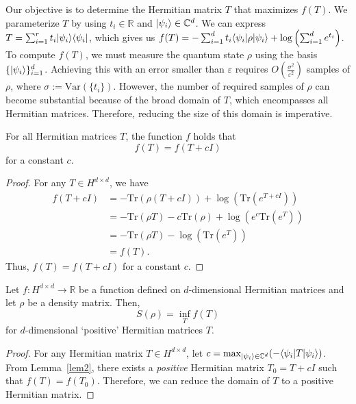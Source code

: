 \documentclass[aps,groupedaddress,superscriptaddress,amssymb,amsmath,amsbsy,amsfonts,twocolumn,pra]{revtex4}
\begin{document}
Our objective is to determine the Hermitian matrix $T$ that maximizes $f(T)$. We parameterize $T$ by using $t_i \in \mathbb{R}$ and $|\psi_i\rangle \in \mathbb{C}^d$. We can express $T = \sum_{i=1}^r t_i |\psi_i\rangle\langle\psi_i|$, which gives us $f(T) = -\sum_{i=1}^d t_i \langle\psi_i|\rho|\psi_i\rangle + \log\left(\sum_{i=1}^d e^{t_i}\right)$. To compute $f(T)$, we must measure the quantum state $\rho$ using the basis $\{|\psi_i\rangle\}_{i=1}^d$. Achieving this with an error smaller than $\varepsilon$ requires $O(\frac{\sigma^2}{\varepsilon^{2}})$ samples of $\rho$, where $\sigma:=\text{Var}(\{t_i\})$. However, the number of required samples of $\rho$ can become substantial because of the broad domain of $T$, which encompasses all Hermitian matrices. Therefore, reducing the size of this domain is imperative.

\begin{lemma}[] \label{lem2}
For all Hermitian matrices $T$, the function $f$ holds that
\begin{equation} \label{identity}
f(T) = f(T+cI) 
\end{equation}
for a constant $c$.
\end{lemma}

\begin{proof}
For any $T \in H^{d \times d}$, we have
\begin{align*}
f(T+cI) &= -\text{Tr}(\rho(T+cI)) + \log\left(\text{Tr}(e^{T+cI})\right) \\
&= -\text{Tr}(\rho T) - c\text{Tr}(\rho) + \log\left(e^c\text{Tr}(e^T)\right) \\
&= -\text{Tr}(\rho T) - \log\left(\text{Tr}(e^T)\right) \\
&= f(T).
\end{align*}
Thus, $f(T) = f(T+cI)$ for a constant $c$.
\end{proof}

\begin{proposition} \label{}
Let $f: H^{d \times d} \rightarrow \mathbb{R}$ be a function defined on $d$-dimensional Hermitian matrices and let $\rho$ be a density matrix. Then,
\begin{equation} \label{identity}
S(\rho) = \inf_Tf(T)
\end{equation}
for $d$-dimensional `positive' Hermitian matrices $T$.
\end{proposition}

\begin{proof}
For any Hermitian matrix $T \in H^{d \times d}$, let $c = \max_{|\psi_i\rangle\in \mathbb{C}^d}(-\langle\psi_i|T|\psi_i\rangle)$. From Lemma~\ref{lem2}, there exists a \emph{positive} Hermitian matrix $T_0 = T+cI$ such that $f(T)=f(T_0)$. Therefore, we can reduce the domain of $T$ to a positive Hermitian matrix.
\end{proof}
\end{document}
